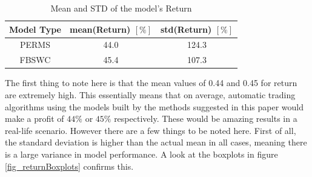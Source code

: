 \begin{table}
\label{table_firstRunReturn}	
\caption{Mean and STD of the model's Return}
\begin{tabular}{ c | c | c }		
  Model Type & mean(Return)  $[\%]$ & std(Return) $[\%]$ \\
  \hline
  PERMS & 44.0 & 124.3 \\
  FBSWC & 45.4 & 107.3 \\
\end{tabular}
\end{table}

 The first thing to note here is that the mean values of 0.44 and 0.45 for return are extremely high. This essentially means that on average, automatic trading algorithms using the models built by the methods suggested in this paper would make a profit of $44\%$ or $45\%$ respectively. These would be amazing results in a real-life scenario. However there are a few things to be noted here. First of all, the standard deviation is higher than the actual mean in all cases, meaning there is a large variance in model performance. A look at the boxplots in figure \ref{fig_returnBoxplots} confirms this.
 
